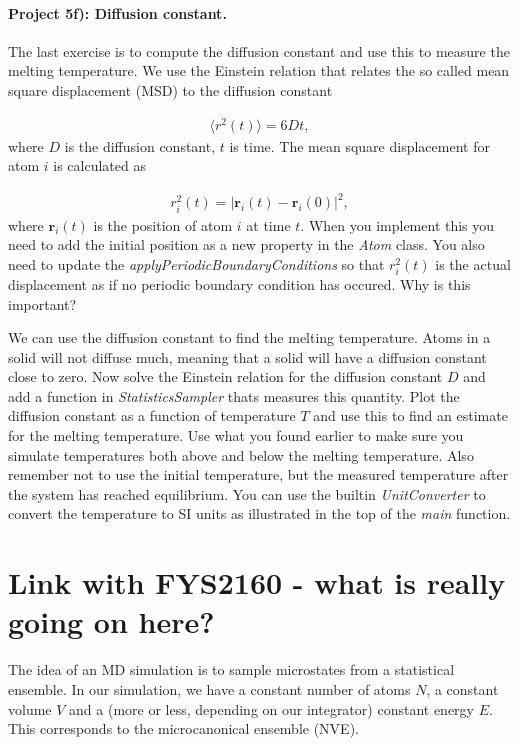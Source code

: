 \documentclass[%
oneside,                 %
final,                   %
10pt]{article}
\begin{document}
\paragraph{Project 5f): Diffusion constant.}
The last exercise is to compute the diffusion constant and use this to measure the melting temperature. We use the Einstein relation that relates the so called mean square displacement (MSD) to the diffusion constant

\begin{align}
	\langle r^2(t) \rangle = 6Dt,
\end{align}
where $D$ is the diffusion constant, $t$ is time. The mean square displacement for atom $i$ is calculated as

\begin{align}
	r_i^2(t) = |\mathbf{r}_i(t) - \mathbf{r}_i(0)|^2,
\end{align}
where $\mathbf{r}_i(t)$ is the position of atom $i$ at time $t$. When you implement this you need to add the initial position as a new property in the \emph{Atom} class. You also need to update the \emph{applyPeriodicBoundaryConditions} so that $r_i^2(t)$ is the actual displacement as if no periodic boundary condition has occured. Why is this important?

We can use the diffusion constant to find the melting temperature. Atoms in a solid will not diffuse much, meaning that a solid will have a diffusion constant close to zero. Now solve the Einstein relation for the diffusion constant $D$ and add a function in \emph{StatisticsSampler} thats measures this quantity. Plot the diffusion constant as a function of temperature $T$ and use this to find an estimate for the melting temperature. Use what you found earlier  to make sure you simulate temperatures both above and below the melting temperature. Also remember not to use the initial temperature, but the measured temperature after the system has reached equilibrium. You can use the builtin \emph{UnitConverter} to convert the temperature to SI units as illustrated in the top of the \emph{main} function. 


\section*{Link with FYS2160 - what is really going on here?}
The idea of an MD simulation is to sample microstates from a statistical ensemble. In our simulation, we have a constant number of atoms $N$, a constant volume $V$ and a (more or less, depending on our integrator) constant energy $E$. This corresponds to the microcanonical ensemble (NVE). 
\end{document}
